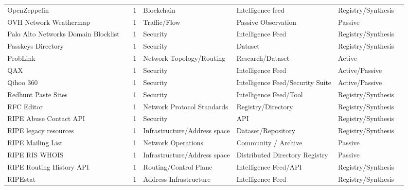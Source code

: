 \begin{table}[h!]
\begin{tabular}{lllllll}
OpenZeppelin & \cite{openzeppelin} & 1 & Blockchain & Intelligence feed & Registry/Synthesis & \cite{10.1145/3777912.3809150} \\
OVH Network Weathermap & \cite{ovhwm} & 1 & Traffic/Flow & Passive Observation & Passive & \cite{10.1145/3517745.3561462} \\
Palo Alto Networks Domain Blocklist & \cite{paloalto} & 1 & Security & Intelligence Feed & Registry/Synthesis & \cite{10.1145/3618257.3624805} \\
Passkeys Directory & \cite{passkey} & 1 & Security & Dataset & Registry/Synthesis & \cite{10.1007/978-3-032-18268-5_15} \\
ProbLink & \cite{problink} & 1 & Network Topology/Routing & Research/Dataset & Active & \cite{10.1145/3487552.3487825} \\
QAX & \cite{qax} & 1 & Security & Intelligence Feed & Active/Passive & \cite{10.1145/3618257.3624839} \\
Qihoo 360 & \cite{qihoo} & 1 & Security & Intelligence Feed/Security Suite & Active/Passive & \cite{10.1007/978-3-031-56249-5_6} \\
Redhunt Paste Sites & \cite{redhunt} & 1 & Security & Intelligence Feed/Tool & Registry/Synthesis & \cite{10.1145/3777912.3809151} \\
RFC Editor & \cite{rfc} & 1 & Network Protocol Standards & Registry/Directory & Registry/Synthesis & \cite{10.1145/3487552.3487821} \\
RIPE Abuse Contact API & \cite{ripeabuse} & 1 & Security & API & Registry/Synthesis & \cite{10.1145/3777912.3809155} \\
RIPE legacy resources & \cite{ripelegacy} & 1 & Infrastructure/Address space & Dataset/Repository & Registry/Synthesis & \cite{10.1145/3487552.3487838} \\
RIPE Mailing List & \cite{ripemailinglists} & 1 & Network Operations & Community / Archive & Passive & \cite{10.1007/978-3-032-18268-5_5} \\
RIPE RIS WHOIS & \cite{riswhois} & 1 & Infrastructure/Address space & Distributed Directory Registry & Passive & \cite{10.1145/3777912.3839812} \\
RIPE Routing History API & \cite{historyapi} & 1 & Routing/Control Plane & Intelligence Feed/API & Registry/Synthesis & \cite{10.1145/3517745.3561421} \\
RIPEstat & \cite{ripestat} & 1 & Address Infrastructure & Intelligence Feed & Registry/Synthesis & \cite{10.1007/978-3-032-18268-5_9} \\

\end{tabular}
\end{table}
